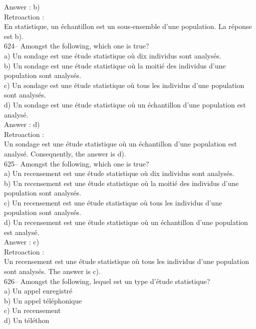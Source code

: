 ﻿\documentclass[letterpaper, 12pt]{article}
\begin{document}
Answer : b)\\

Retroaction : \\
En statistique, un \'echantillon est un sous-ensemble d'une population.  La
r\'eponse est b).\\

624-- Amongst the following, which one is true?\\
a) Un sondage est une \'etude statistique o\`u dix individus sont
analys\'es.\\
b) Un sondage est une \'etude statistique o\`u la moiti\'e des individus
d'une population sont analys\'es.\\
c) Un sondage est une \'etude statistique o\`u tous les individus d'une
population sont analys\'es.\\
d) Un sondage est une \'etude statistique o\`u un \'echantillon d'une
population est analys\'e.\\

Answer : d)\\

Retroaction : \\
Un sondage est une \'etude statistique o\`u un \'echantillon d'une
population est analys\'e.  Consequently, the answer is d).\\

625-- Amongst the following, which one is true?\\
a) Un recensement est une \'etude statistique o\`u dix individus sont
analys\'es.\\
b) Un recensement est une \'etude statistique o\`u la moiti\'e des individus
d'une population sont analys\'es.\\
c) Un recensement est une \'etude statistique o\`u tous les individus d'une
population sont analys\'es.\\
d) Un recensement est une \'etude statistique o\`u un \'echantillon d'une
population est analys\'e.\\

Answer : c)\\

Retroaction : \\
Un recensement est une \'etude statistique o\`u tous les individus d'une
population sont analys\'es.  The answer is c).\\

626-- Amongst the following, lequel est un type d'\'etude
statistique?\\
a) Un appel enregistr\'e\\
b) Un appel t\'el\'ephonique\\
c) Un recensement\\
d) Un t\'el\'ethon\\
\end{document}
